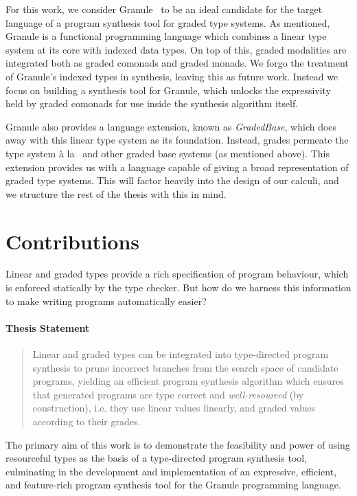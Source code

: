 For this work, we consider Granule~\citep{DBLP:journals/pacmpl/OrchardLE19} to
be an ideal candidate for the target language of a program synthesis tool for
graded type systems. As mentioned, Granule is a functional programming language
which combines a linear type system at its core with indexed data types. On top
of this, graded modalities are integrated both as graded comonads and graded
monads. We forgo the treatment of Granule's indexed types in synthesis, leaving
this as future work. Instead we focus on building a synthesis tool for Granule,
which unlocks the expressivity held by graded comonads for use inside the
synthesis algorithm itself.

Granule also provides a language extension, known as \emph{GradedBase}, which
does away with this linear type system as its foundation. Instead, grades
permeate the type system à la~\citet{petricek2014coeffects} and other graded
base systems (as mentioned above). This extension provides us with a language capable of giving a
broad representation of graded type systems. This will factor heavily into the
design of our calculi, and we structure the rest of the thesis with this in
mind.

\section{Contributions}
Linear and graded types provide a rich specification of program behaviour, which
is enforced statically by the type checker. But how do we harness this
information to make    
writing programs automatically easier?  

\paragraph{Thesis Statement} 
\label{para:thesis-statement}
\begin{quote}
      Linear and graded
types can be integrated into type-directed program synthesis to prune incorrect
branches from the search space of candidate programs, yielding an efficient
program synthesis algorithm which ensures that generated programs are type
correct and \emph{well-resourced} (by construction), i.e. they use linear values linearly, and
graded values according to their grades.
\end{quote}
 
The primary aim of this work is to demonstrate the feasibility and power of
using resourceful types as the basis of a type-directed program synthesis tool,
culminating in the development and implementation of an expressive, efficient,
and feature-rich program synthesis tool for the Granule programming language. 

